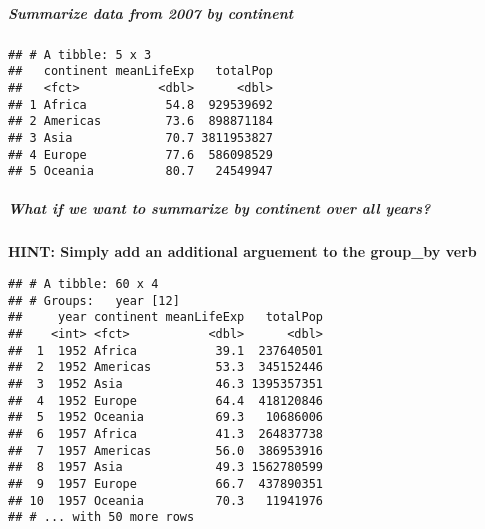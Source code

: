 \documentclass[]{article}
\newenvironment{Shaded}{\begin{snugshade}}{\end{snugshade}}
\newcommand{\KeywordTok}[1]{\textcolor[rgb]{0.13,0.29,0.53}{\textbf{#1}}}
\newcommand{\DataTypeTok}[1]{\textcolor[rgb]{0.13,0.29,0.53}{#1}}
\newcommand{\DecValTok}[1]{\textcolor[rgb]{0.00,0.00,0.81}{#1}}
\newcommand{\StringTok}[1]{\textcolor[rgb]{0.31,0.60,0.02}{#1}}
\newcommand{\OperatorTok}[1]{\textcolor[rgb]{0.81,0.36,0.00}{\textbf{#1}}}
\newcommand{\NormalTok}[1]{#1}
\let\oldsubparagraph\subparagraph
\renewcommand{\subparagraph}[1]{\oldsubparagraph{#1}\mbox{}}
\begin{document}
\subparagraph{Summarize data from 2007 by
continent}\label{summarize-data-from-2007-by-continent}

\begin{Shaded}
\end{Shaded}

\begin{verbatim}
## # A tibble: 5 x 3
##   continent meanLifeExp   totalPop
##   <fct>           <dbl>      <dbl>
## 1 Africa           54.8  929539692
## 2 Americas         73.6  898871184
## 3 Asia             70.7 3811953827
## 4 Europe           77.6  586098529
## 5 Oceania          80.7   24549947
\end{verbatim}

\subparagraph{What if we want to summarize by continent over all
years?}\label{what-if-we-want-to-summarize-by-continent-over-all-years}

\textbf{HINT: Simply add an additional arguement to the group\_by verb}

\begin{Shaded}
\end{Shaded}

\begin{verbatim}
## # A tibble: 60 x 4
## # Groups:   year [12]
##     year continent meanLifeExp   totalPop
##    <int> <fct>           <dbl>      <dbl>
##  1  1952 Africa           39.1  237640501
##  2  1952 Americas         53.3  345152446
##  3  1952 Asia             46.3 1395357351
##  4  1952 Europe           64.4  418120846
##  5  1952 Oceania          69.3   10686006
##  6  1957 Africa           41.3  264837738
##  7  1957 Americas         56.0  386953916
##  8  1957 Asia             49.3 1562780599
##  9  1957 Europe           66.7  437890351
## 10  1957 Oceania          70.3   11941976
## # ... with 50 more rows
\end{verbatim}
\end{document}
